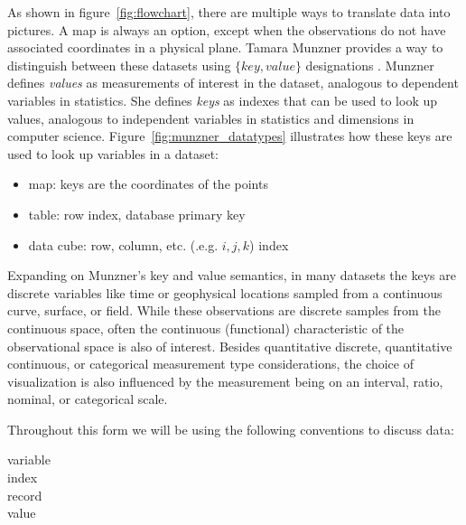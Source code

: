 \documentclass[../main.tex]{subfiles}
\begin{document}
As shown in figure~\ref{fig:flowchart}, there are multiple ways to translate data into pictures. A map is always an option, except when the observations do not have associated coordinates in a physical plane. Tamara Munzner provides a way to distinguish between these datasets using $\{key, value\}$ designations \cite{munznerVisualizationAnalysisDesign2014}. Munzner defines \textit{values} as measurements of interest in the dataset, analogous to dependent variables in statistics. She defines \textit{keys} as indexes that can be used to look up values, analogous to independent variables in statistics and dimensions in computer science. Figure~\ref{fig:munzner_datatypes} illustrates how these keys are used to look up variables in a dataset: 
\begin{itemize}
	\item map: keys are the coordinates of the points
	\item table: row index, database primary key
	\item data cube: row, column, etc. (.e.g. $i,j,k$) index
\end{itemize}

Expanding on Munzner's key and value semantics, in many datasets the keys are discrete variables like time or geophysical locations sampled from a continuous curve, surface, or field. While these observations are discrete samples from the continuous space, often the continuous (functional) characteristic\cite{ramsayFunctionalDataAnalysis2006a,mullerFunctionalVarianceProcesses2006a} of the observational space is also of interest. Besides quantitative discrete, quantitative continuous, or categorical measurement type considerations, the choice of visualization is also influenced by the measurement being on an interval, ratio, nominal, or categorical scale. 

Throughout this form we will be using the following conventions to discuss data:

\begin{description}
    \item[variable]
    \item[index]  
    \item[record]
    \item[value]  
\end{description}
\end{document}

